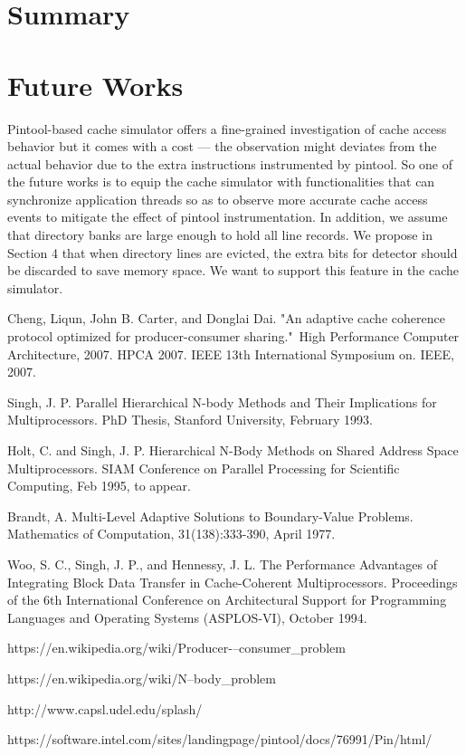 \documentclass[conference]{IEEEtran}
\begin{document}
\section{Summary}

\newpage




\section{Future Works}

Pintool-based \cite{pintool} cache simulator offers a fine-grained investigation of cache access behavior but it comes with a cost --- the observation might deviates from the actual behavior due to the extra instructions instrumented by pintool. So one of the future works is to equip the cache simulator with functionalities that can synchronize application threads so as to observe more accurate cache access events to mitigate the effect of pintool instrumentation. In addition, we assume that directory banks are large enough to hold all line records. We propose in Section 4 that when directory lines are evicted, the extra bits for detector should be discarded to save memory space. We want to support this feature in the cache simulator.

\begin{thebibliography}{1}

Cheng, Liqun, John B. Carter, and Donglai Dai. "An adaptive cache coherence protocol optimized for producer-consumer sharing." High Performance Computer Architecture, 2007. HPCA 2007. IEEE 13th International Symposium on. IEEE, 2007.

Singh, J. P.  Parallel Hierarchical N-body Methods and Their Implications for Multiprocessors.  PhD Thesis, Stanford University, February 1993.

Holt, C. and Singh, J. P.  Hierarchical N-Body Methods on Shared Address Space Multiprocessors.  SIAM Conference on Parallel Processing for Scientific Computing, Feb 1995, to appear.

Brandt, A. Multi-Level Adaptive Solutions to Boundary-Value Problems. Mathematics of Computation, 31(138):333-390, April 1977.

Woo, S. C., Singh, J. P., and Hennessy, J. L.  The Performance Advantages of Integrating Block Data Transfer in Cache-Coherent Multiprocessors. Proceedings of the 6th International Conference on Architectural Support for Programming Languages and Operating Systems (ASPLOS-VI), October 1994.

https://en.wikipedia.org/wiki/Producer-–consumer\_problem

https://en.wikipedia.org/wiki/N--body\_problem

http://www.capsl.udel.edu/splash/

https://software.intel.com/sites/landingpage/pintool/docs/76991/Pin/html/

\end{thebibliography}
\end{document}
